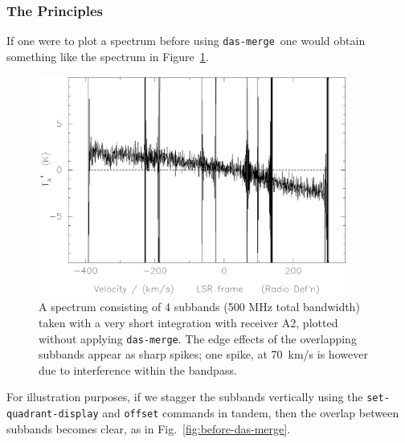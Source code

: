 \documentclass[11pt,twoside]{article}
\newcommand{\dm}{{\tt das-merge}}
\begin{document}
\subsubsection{The Principles}
If one were to plot a spectrum before using \dm\ one would obtain
something like the spectrum in Figure~\ref{fig:dm_dirty}.
%
\begin{figure}[htb]
\centering
\includegraphics[width=4.0in]{sc8_dm_dirty.ps}
\vspace*{-0.5cm}
\begin{center}
\begin{minipage}[t]{5in}
\caption[Spectrum without \dm ]
{\small{A spectrum consisting of 4 subbands (500 MHz total bandwidth)
taken with a very short integration with receiver A2, plotted without
applying \dm .  The edge effects of the overlapping subbands appear as
sharp spikes; one spike, at 70~km/s is however due to interference
within the bandpass.}}
\label{fig:dm_dirty}
\end{minipage}
\end{center}
\end{figure}

For illustration purposes, if we stagger the subbands vertically
using the {\tt set-quadrant-display} and {\tt offset} commands in
tandem, then the overlap between subbands becomes clear, as in
Fig.~\ref{fig:before-das-merge}.
\end{document}
